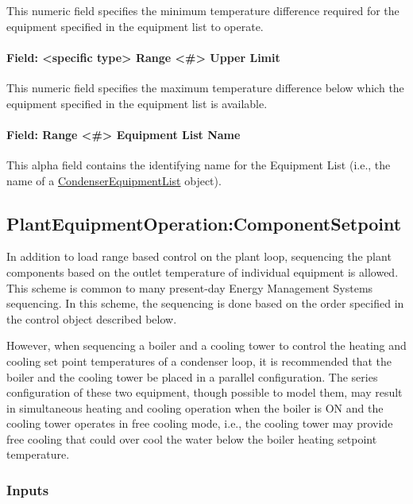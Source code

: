 This numeric field specifies the minimum temperature difference required for the equipment specified in the equipment list to operate.

\paragraph{Field: \textless{}specific type\textgreater{} Range \textless{}\#\textgreater{} Upper Limit}\label{field-specific-type-range-upper-limit}

This numeric field specifies the maximum temperature difference below which the equipment specified in the equipment list is available.

\paragraph{Field: Range \textless{}\#\textgreater{} Equipment List Name}\label{field-range-equipment-list-name-2}

This alpha field contains the identifying name for the Equipment List (i.e., the name of a \hyperref[condenserequipmentlist]{CondenserEquipmentList} object).

\subsection{PlantEquipmentOperation:ComponentSetpoint}\label{plantequipmentoperationcomponentsetpoint}

In addition to load range based control on the plant loop, sequencing the plant components based on the outlet temperature of individual equipment is allowed. This scheme is common to many present-day Energy Management Systems sequencing. In this scheme, the sequencing is done based on the order specified in the control object described below.

However, when sequencing a boiler and a cooling tower to control the heating and cooling set point temperatures of a condenser loop, it is recommended that the boiler and the cooling tower be placed in a parallel configuration. The series configuration of these two equipment, though possible to model them, may result in simultaneous heating and cooling operation when the boiler is ON and the cooling tower operates in free cooling mode, i.e., 
the cooling tower may provide free cooling that could over cool the water below the boiler heating setpoint temperature.  


\subsubsection{Inputs}\label{inputs-12-011}

